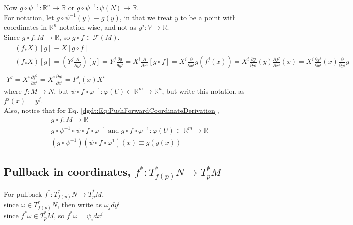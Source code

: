 Now $g\circ \psi^{-1} : \mathbb{R}^n \to \mathbb{R}$ or $g \circ \psi^{-1} : \psi(N) \to \mathbb{R}$. \\

For notation, let $g\circ \psi^{-1} (y) \equiv g(y)$, in that we treat $y$ to be a point with coordinates in $\mathbb{R}^n$ notation-wise, and not as $y^j : V \to \mathbb{R}$. \\

Since $g\circ f: M \to \mathbb{R}$, so $g\circ f \in \mathcal{F}(M)$.
\begin{equation}\label{dgdt:Eq:PushForwardCoordinateDerivation}
\begin{gathered}
\begin{aligned}
& (f_* X)[g] \equiv X[g \circ f] \\
& (f_* X)[g] = (Y^j \frac{\partial}{\partial y^j})[g] = Y^j \frac{\partial g}{ \partial y^j} = X^i \frac{\partial}{\partial x^i} [g \circ f] = X^i \frac{\partial}{\partial x^i} g(f^j(x)) = X^i \frac{\partial g}{ \partial y^j}(y) \frac{\partial f^j}{ \partial x^i}(x) = X^i \frac{\partial f^j}{ \partial x^i}(x) \frac{\partial}{\partial y^j} g
\end{aligned} \\
Y^j = X^i \frac{ \partial f^j}{\partial x^i} = X^i \frac{ \partial y^j}{\partial x^i} = F^j_{\, \, i}(x)X^i
\end{gathered}
\end{equation}
where $f:M \to N$, but $\psi \circ f \circ \varphi^{-1} : \varphi(U) \subset \mathbb{R}^m \to \mathbb{R}^n$, but write this notation as $f^j(x) = y^j$. \\

Also, notice that for Eq. \ref{dgdt:Eq:PushForwardCoordinateDerivation},
\[
\begin{gathered}
	g\circ f: M \to \mathbb{R} \\
	g\circ \psi^{-1} \circ \psi \circ f \circ \varphi^{-1} \text{ and } g\circ f \circ \varphi^{-1} : \varphi(U) \subset \mathbb{R}^m \to \mathbb{R} \\
	(g\circ \psi^{-1}) (\psi \circ f \circ \varphi^{1}) (x) \equiv g(y(x))
\end{gathered}
\]

\subsection{Pullback in coordinates, $f^* : T^*_{f(p)}N \to T^*_pM$ } 

For pullback $f^* : T^*_{f(p)}N \to T^*_pM$, \\
since $\omega \in T^*_{f(p)}N$, then write as $\omega_j dy^j$ \\
since $f^*\omega \in T^*_pM$, so $f^* \omega = \psi_i dx^i$ 


